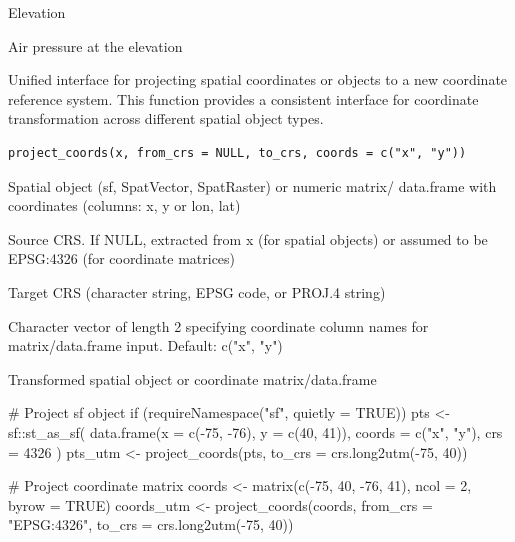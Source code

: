 \documentclass[a4paper]{book}
\begin{document}
%
\begin{Arguments}
\begin{ldescription}
\item[\code{z}] Elevation 
\end{ldescription}
\end{Arguments}
%
\begin{Value}
Air pressure at the elevation 
\end{Value}
%
\begin{Description}\relax
Unified interface for projecting spatial coordinates or objects to a new
coordinate reference system. This function provides a consistent interface
for coordinate transformation across different spatial object types.
\end{Description}
%
\begin{Usage}
\begin{verbatim}
project_coords(x, from_crs = NULL, to_crs, coords = c("x", "y"))
\end{verbatim}
\end{Usage}
%
\begin{Arguments}
\begin{ldescription}
\item[\code{x}] Spatial object (sf, SpatVector, SpatRaster) or numeric matrix/
data.frame with coordinates (columns: x, y or lon, lat)

\item[\code{from\_crs}] Source CRS. If NULL, extracted from x (for spatial objects)
or assumed to be EPSG:4326 (for coordinate matrices)

\item[\code{to\_crs}] Target CRS (character string, EPSG code, or PROJ.4 string)

\item[\code{coords}] Character vector of length 2 specifying coordinate column
names for matrix/data.frame input. Default: c("x", "y")
\end{ldescription}
\end{Arguments}
%
\begin{Value}
Transformed spatial object or coordinate matrix/data.frame
\end{Value}
%
\begin{Examples}
\begin{ExampleCode}
# Project sf object
if (requireNamespace("sf", quietly = TRUE)) {
  pts <- sf::st_as_sf(
    data.frame(x = c(-75, -76), y = c(40, 41)),
    coords = c("x", "y"),
    crs = 4326
  )
  pts_utm <- project_coords(pts, to_crs = crs.long2utm(-75, 40))
}

# Project coordinate matrix
coords <- matrix(c(-75, 40, -76, 41), ncol = 2, byrow = TRUE)
coords_utm <- project_coords(coords, from_crs = "EPSG:4326",
                              to_crs = crs.long2utm(-75, 40))
\end{ExampleCode}
\end{Examples}
\end{document}
